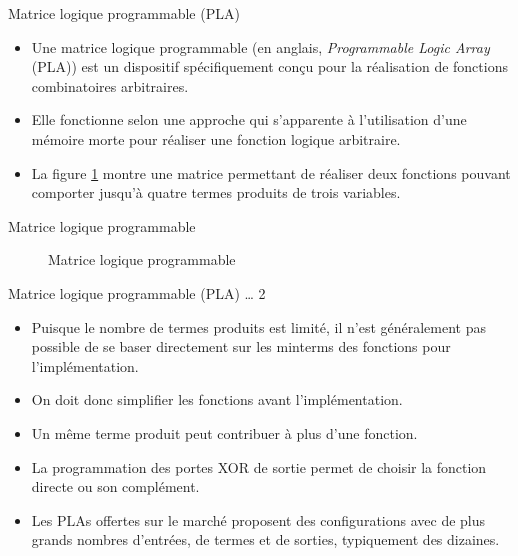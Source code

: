 \documentclass[presentation]{beamer}
\begin{document}
\begin{frame}[label={sec:org952666a}]{Matrice logique programmable (PLA)}
\begin{itemize}
\item Une \alert{matrice logique programmable} (en anglais, \emph{Programmable Logic Array} (PLA)) est un dispositif spécifiquement conçu pour la réalisation de fonctions combinatoires arbitraires.

\item Elle fonctionne selon une approche qui s'apparente à l'utilisation d'une mémoire morte pour réaliser une fonction logique arbitraire.

\item La figure \ref{fig:org9337aab} montre une matrice permettant de réaliser deux fonctions pouvant comporter jusqu'à quatre termes produits de trois variables.
\end{itemize}
\end{frame}

\begin{frame}[label={sec:orgef55f5a}]{Matrice logique programmable}
\begin{figure}[htbp]
\centering

\caption{\label{fig:org9337aab}Matrice logique programmable}
\end{figure}
\end{frame}

\begin{frame}[label={sec:org57a4b38}]{Matrice logique programmable (PLA) \ldots{} 2}
\begin{itemize}
\item Puisque le nombre de termes produits est limité, il n'est généralement pas possible de se baser directement sur les minterms des fonctions pour l'implémentation.

\item On doit donc simplifier les fonctions avant l'implémentation.

\item Un même terme produit peut contribuer à plus d'une fonction.

\item La programmation des portes XOR de sortie permet de choisir la fonction directe ou son complément.

\item Les PLAs offertes sur le marché proposent des configurations avec de plus grands nombres d'entrées, de termes et de sorties, typiquement des dizaines.
\end{itemize}
\end{frame}
\end{document}
